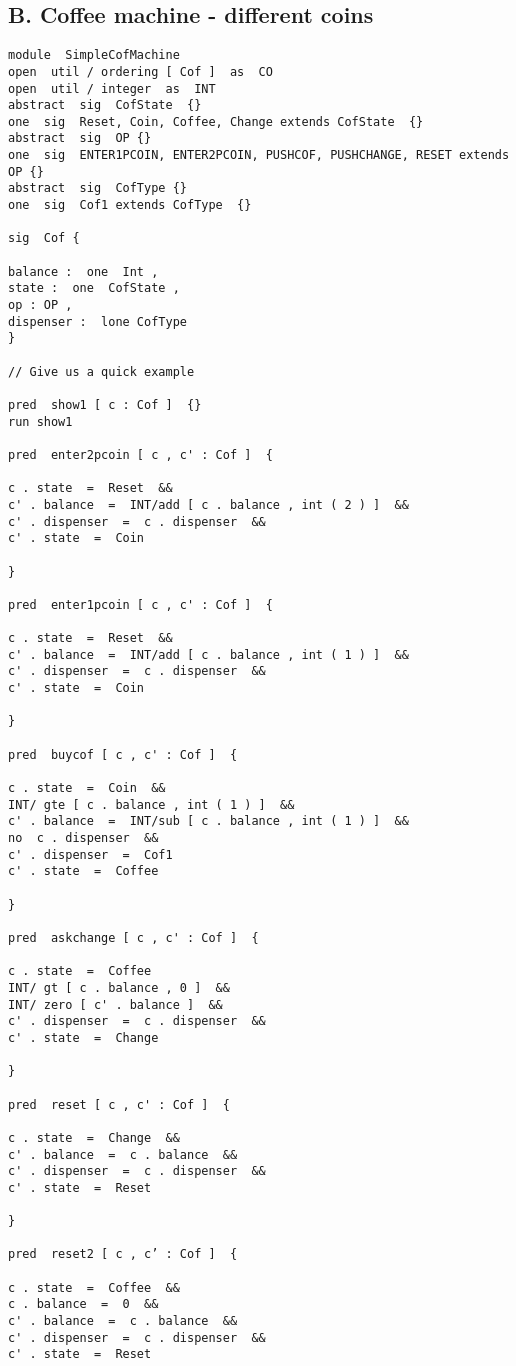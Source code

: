 \documentclass[a4paper,12pt]{extarticle}
\begin{document}
\subsection{B.  Coffee machine - different coins}
\begin{verbatim}
module  SimpleCofMachine
open  util / ordering [ Cof ]  as  CO
open  util / integer  as  INT
abstract  sig  CofState  {}
one  sig  Reset, Coin, Coffee, Change extends CofState  {}
abstract  sig  OP {}
one  sig  ENTER1PCOIN, ENTER2PCOIN, PUSHCOF, PUSHCHANGE, RESET extends OP {}
abstract  sig  CofType {}
one  sig  Cof1 extends CofType  {}

sig  Cof {

balance :  one  Int ,
state :  one  CofState ,
op : OP ,
dispenser :  lone CofType
}

// Give us a quick example

pred  show1 [ c : Cof ]  {}
run show1

pred  enter2pcoin [ c , c' : Cof ]  {

c . state  =  Reset  &&
c' . balance  =  INT/add [ c . balance , int ( 2 ) ]  &&
c' . dispenser  =  c . dispenser  &&
c' . state  =  Coin

}

pred  enter1pcoin [ c , c' : Cof ]  {

c . state  =  Reset  &&
c' . balance  =  INT/add [ c . balance , int ( 1 ) ]  &&
c' . dispenser  =  c . dispenser  &&
c' . state  =  Coin

}

pred  buycof [ c , c' : Cof ]  {

c . state  =  Coin  &&
INT/ gte [ c . balance , int ( 1 ) ]  &&
c' . balance  =  INT/sub [ c . balance , int ( 1 ) ]  &&
no  c . dispenser  &&
c' . dispenser  =  Cof1
c' . state  =  Coffee

}

pred  askchange [ c , c' : Cof ]  {

c . state  =  Coffee
INT/ gt [ c . balance , 0 ]  &&
INT/ zero [ c' . balance ]  &&
c' . dispenser  =  c . dispenser  &&
c' . state  =  Change

}

pred  reset [ c , c' : Cof ]  {

c . state  =  Change  &&
c' . balance  =  c . balance  &&
c' . dispenser  =  c . dispenser  &&
c' . state  =  Reset

}

pred  reset2 [ c , c’ : Cof ]  {

c . state  =  Coffee  &&
c . balance  =  0  &&
c' . balance  =  c . balance  &&
c' . dispenser  =  c . dispenser  &&
c' . state  =  Reset


\end{verbatim}
\end{document}
